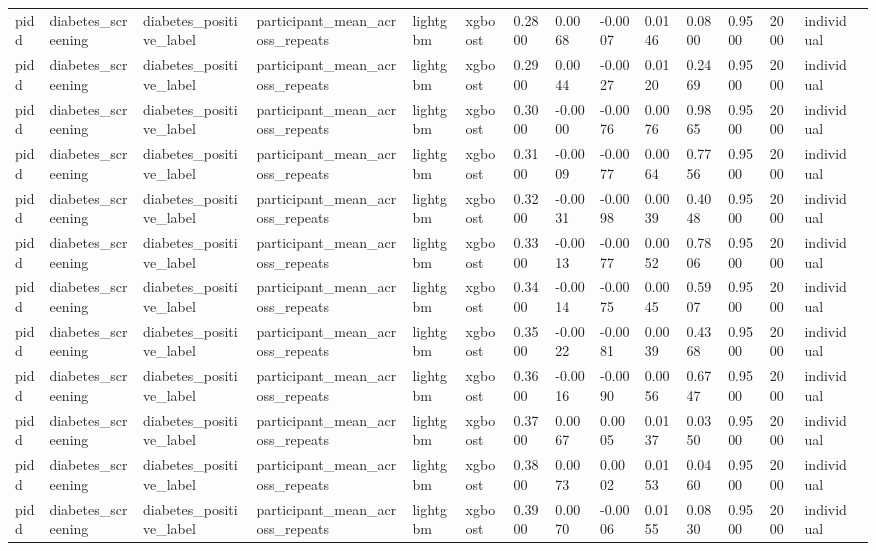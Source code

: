 \begin{tabular}{lllllllllllllll}
pidd & diabetes\_screening & diabetes\_positive\_label & participant\_mean\_across\_repeats & lightgbm & xgboost & 0.2800 & 0.0068 & -0.0007 & 0.0146 & 0.0800 & 0.9500 & 2000 & individual &  \\
pidd & diabetes\_screening & diabetes\_positive\_label & participant\_mean\_across\_repeats & lightgbm & xgboost & 0.2900 & 0.0044 & -0.0027 & 0.0120 & 0.2469 & 0.9500 & 2000 & individual &  \\
pidd & diabetes\_screening & diabetes\_positive\_label & participant\_mean\_across\_repeats & lightgbm & xgboost & 0.3000 & -0.0000 & -0.0076 & 0.0076 & 0.9865 & 0.9500 & 2000 & individual &  \\
pidd & diabetes\_screening & diabetes\_positive\_label & participant\_mean\_across\_repeats & lightgbm & xgboost & 0.3100 & -0.0009 & -0.0077 & 0.0064 & 0.7756 & 0.9500 & 2000 & individual &  \\
pidd & diabetes\_screening & diabetes\_positive\_label & participant\_mean\_across\_repeats & lightgbm & xgboost & 0.3200 & -0.0031 & -0.0098 & 0.0039 & 0.4048 & 0.9500 & 2000 & individual &  \\
pidd & diabetes\_screening & diabetes\_positive\_label & participant\_mean\_across\_repeats & lightgbm & xgboost & 0.3300 & -0.0013 & -0.0077 & 0.0052 & 0.7806 & 0.9500 & 2000 & individual &  \\
pidd & diabetes\_screening & diabetes\_positive\_label & participant\_mean\_across\_repeats & lightgbm & xgboost & 0.3400 & -0.0014 & -0.0075 & 0.0045 & 0.5907 & 0.9500 & 2000 & individual &  \\
pidd & diabetes\_screening & diabetes\_positive\_label & participant\_mean\_across\_repeats & lightgbm & xgboost & 0.3500 & -0.0022 & -0.0081 & 0.0039 & 0.4368 & 0.9500 & 2000 & individual &  \\
pidd & diabetes\_screening & diabetes\_positive\_label & participant\_mean\_across\_repeats & lightgbm & xgboost & 0.3600 & -0.0016 & -0.0090 & 0.0056 & 0.6747 & 0.9500 & 2000 & individual &  \\
pidd & diabetes\_screening & diabetes\_positive\_label & participant\_mean\_across\_repeats & lightgbm & xgboost & 0.3700 & 0.0067 & 0.0005 & 0.0137 & 0.0350 & 0.9500 & 2000 & individual &  \\
pidd & diabetes\_screening & diabetes\_positive\_label & participant\_mean\_across\_repeats & lightgbm & xgboost & 0.3800 & 0.0073 & 0.0002 & 0.0153 & 0.0460 & 0.9500 & 2000 & individual &  \\
pidd & diabetes\_screening & diabetes\_positive\_label & participant\_mean\_across\_repeats & lightgbm & xgboost & 0.3900 & 0.0070 & -0.0006 & 0.0155 & 0.0830 & 0.9500 & 2000 & individual &  \\

\end{tabular}
